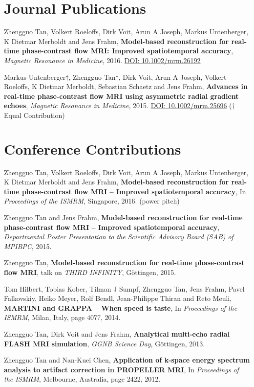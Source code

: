 
\section*{Journal Publications}
\begin{etaremune}
\item Zhengguo Tan, Volkert Roeloffs, Dirk Voit, Arun A Joseph, Markus Untenberger, K Dietmar Merboldt and Jens Frahm, \textbf{Model-based reconstruction for real-time phase-contrast flow MRI: Improved spatiotemporal accuracy}, \textit{Magnetic Resonance in Medicine}, 2016. \href{http://dx.doi.org/10.1002/mrm.26192}{DOI: 10.1002/mrm.26192}
\item Markus Untenberger$\dagger$, Zhengguo Tan$\dagger$, Dirk Voit, Arun A Joseph, Volkert Roeloffs, K Dietmar Merboldt, Sebastian Schaetz and Jens Frahm, \textbf{Advances in real-time phase-contrast flow MRI using asymmetric radial gradient echoes}, \textit{Magnetic Resonance in Medicine}, 2015. \href{http://dx.doi.org/10.1002/mrm.25696}{DOI: 10.1002/mrm.25696} ($\dagger$ Equal Contribution)
\end{etaremune}


\section*{Conference Contributions}
\begin{etaremune}
\item Zhengguo Tan, Volkert Roeloffs, Dirk Voit, Arun A Joseph, Markus Untenberger, K Dietmar Merboldt and Jens Frahm, \textbf{Model-based reconstruction for real-time phase-contrast flow MRI -- Improved spatiotemporal accuracy}, In \textit{Proceedings of the  ISMRM}, Singapore, 2016. (power pitch)
\item Zhengguo Tan and Jens Frahm, \textbf{Model-based reconstruction for real-time phase-contrast flow MRI -- Improved spatiotemporal accuracy}, \textit{Departmental Poster Presentation to the Scientific Advisory Board (SAB) of MPIBPC}, 2015.
\item Zhengguo Tan, \textbf{Model-based reconstruction for real-time phase-contrast flow MRI}, talk on \textit{THIRD INFINITY}, G\"{o}ttingen, 2015.
\item Tom Hilbert, Tobias Kober, Tilman J Sumpf, Zhengguo Tan, Jens Frahm, Pavel Falkovskiy, Heiko Meyer, Rolf Bendl, Jean-Philippe Thiran and Reto Meuli, \textbf{MARTINI and GRAPPA -- When speed is taste}, In \textit{Proceedings of the  ISMRM}, Milan, Italy, page 4077, 2014.
\item Zhengguo Tan, Dirk Voit and Jens Frahm, \textbf{Analytical multi-echo radial FLASH MRI simulation}, \textit{ GGNB Science Day}, G\"{o}ttingen, 2013.
\item Zhengguo Tan and Nan-Kuei Chen, \textbf{Application of k-space energy spectrum analysis to artifact correction in PROPELLER MRI}, In \textit{Proceedings of the  ISMRM}, Melbourne, Australia, page 2422, 2012.
\end{etaremune}

